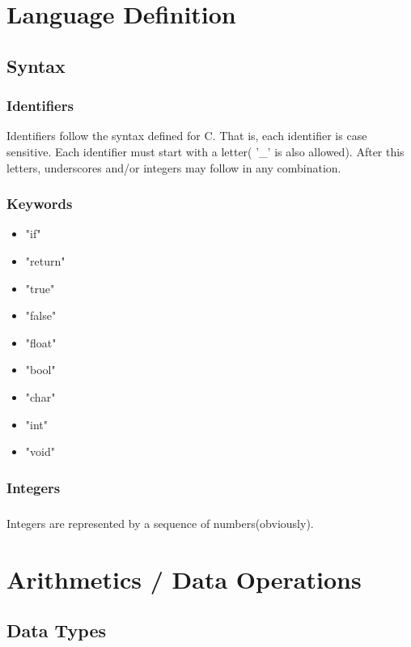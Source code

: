 \documentclass{report}
\begin{document}
\tableofcontents

\chapter{Language Definition}
	\section{Syntax}
		\subsection{Identifiers}
			Identifiers follow the syntax defined for C. That is, each identifier is case sensitive. Each identifier must start with a letter( '\_' is also allowed). After this letters, underscores and/or integers may follow in any combination.
		\subsection{Keywords}
			\begin{itemize}
				\item "if"
				\item "return"
				\item "true"
				\item "false"
				\item "float"
				\item "bool"
				\item "char"
				\item "int"
				
				\item "void"
			\end{itemize}

	\subsection{Integers}
		\paragraph{}
			Integers are represented by a sequence of numbers(obviously).

\chapter{Arithmetics / Data Operations}
	\section{Data Types}
\end{document}
